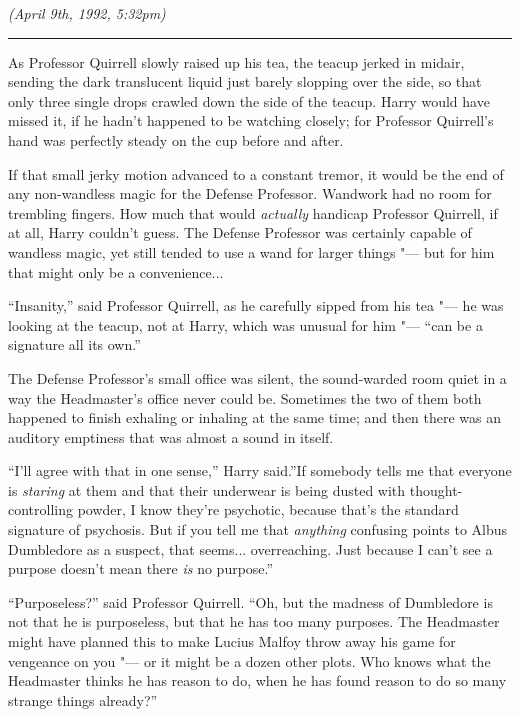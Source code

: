 \emph{(April 9th, 1992, 5:32pm)}

\begin{center}\rule{3in}{0.4pt}\end{center}

As Professor Quirrell slowly raised up his tea, the teacup jerked in
midair, sending the dark translucent liquid just barely slopping over
the side, so that only three single drops crawled down the side of the
teacup. Harry would have missed it, if he hadn't happened to be watching
closely; for Professor Quirrell's hand was perfectly steady on the cup
before and after.

If that small jerky motion advanced to a constant tremor, it would be
the end of any non-wandless magic for the Defense Professor. Wandwork
had no room for trembling fingers. How much that would \emph{actually}
handicap Professor Quirrell, if at all, Harry couldn't guess. The
Defense Professor was certainly capable of wandless magic, yet still
tended to use a wand for larger things "--- but for him that might only be
a convenience...

``Insanity,'' said Professor Quirrell, as he carefully sipped from his
tea "--- he was looking at the teacup, not at Harry, which was unusual for
him "--- ``can be a signature all its own.''

The Defense Professor's small office was silent, the sound-warded room
quiet in a way the Headmaster's office never could be. Sometimes the two
of them both happened to finish exhaling or inhaling at the same time;
and then there was an auditory emptiness that was almost a sound in
itself.

``I'll agree with that in one sense,'' Harry said.''If somebody tells me
that everyone is \emph{staring} at them and that their underwear is
being dusted with thought-controlling powder, I know they're psychotic,
because that's the standard signature of psychosis. But if you tell me
that \emph{anything} confusing points to Albus Dumbledore as a suspect,
that seems... overreaching. Just because I can't see a purpose
doesn't mean there \emph{is} no purpose.''

``Purposeless?'' said Professor Quirrell. ``Oh, but the madness of
Dumbledore is not that he is purposeless, but that he has too many
purposes. The Headmaster might have planned this to make Lucius Malfoy
throw away his game for vengeance on you "--- or it might be a dozen other
plots. Who knows what the Headmaster thinks he has reason to do, when he
has found reason to do so many strange things already?''

